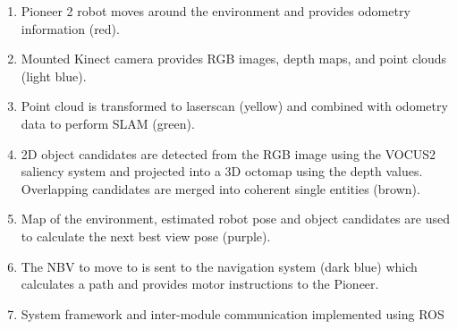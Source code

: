
\begin{enumerate}
	\item Pioneer 2 robot moves around the environment and provides odometry information (red).
	\item Mounted Kinect camera provides RGB images, depth maps, and point clouds (light blue).
	\item Point cloud is transformed to laserscan (yellow) and combined with odometry data to perform SLAM (green).
	\item 2D object candidates are detected from the RGB image using the VOCUS2 saliency system\cite{garcia2013computational} and projected into a 3D octomap\cite{hornung13octomap} using the depth values. Overlapping candidates are merged into coherent single entities (brown).
	\item Map of the environment, estimated robot pose and object candidates are used to calculate the next best view pose (purple).
	\item The NBV to move to is sent to the navigation system (dark blue) which calculates a path and provides motor instructions to the Pioneer.
	\item System framework and inter-module communication implemented using ROS
\end{enumerate}